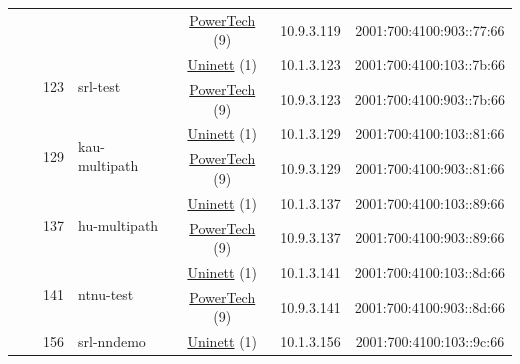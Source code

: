 \begin{small}
\begin{center}
\begin{longtable}{|c|c|c|c|c|c|c|c|}
  &  &  &  & \multicolumn{2}{|c|}{\tiny{\href{http://www.powertech.no}{PowerTech} (9)}} & \tiny{10.9.3.119} & \tiny{2001:700:4100:903::77:66} \\* \cline{3-3}\cline{4-4}\cline{5-5}\cline{6-6}\cline{7-7}\cline{8-8}
  &  & \multirow{2}{*}{\tiny{123}} & \multicolumn{1}{|l|}{\multirow{2}{*}{\tiny{srl-test}}} & \multicolumn{2}{|c|}{\tiny{\href{https://www.uninett.no}{Uninett} (1)}} & \tiny{10.1.3.123} & \tiny{2001:700:4100:103::7b:66} \\* \cline{5-5}\cline{6-6}\cline{7-7}\cline{8-8}
  &  &  &  & \multicolumn{2}{|c|}{\tiny{\href{http://www.powertech.no}{PowerTech} (9)}} & \tiny{10.9.3.123} & \tiny{2001:700:4100:903::7b:66} \\* \cline{3-3}\cline{4-4}\cline{5-5}\cline{6-6}\cline{7-7}\cline{8-8}
  &  & \multirow{2}{*}{\tiny{129}} & \multicolumn{1}{|l|}{\multirow{2}{*}{\tiny{kau-multipath}}} & \multicolumn{2}{|c|}{\tiny{\href{https://www.uninett.no}{Uninett} (1)}} & \tiny{10.1.3.129} & \tiny{2001:700:4100:103::81:66} \\* \cline{5-5}\cline{6-6}\cline{7-7}\cline{8-8}
  &  &  &  & \multicolumn{2}{|c|}{\tiny{\href{http://www.powertech.no}{PowerTech} (9)}} & \tiny{10.9.3.129} & \tiny{2001:700:4100:903::81:66} \\* \cline{3-3}\cline{4-4}\cline{5-5}\cline{6-6}\cline{7-7}\cline{8-8}
  &  & \multirow{2}{*}{\tiny{137}} & \multicolumn{1}{|l|}{\multirow{2}{*}{\tiny{hu-multipath}}} & \multicolumn{2}{|c|}{\tiny{\href{https://www.uninett.no}{Uninett} (1)}} & \tiny{10.1.3.137} & \tiny{2001:700:4100:103::89:66} \\* \cline{5-5}\cline{6-6}\cline{7-7}\cline{8-8}
  &  &  &  & \multicolumn{2}{|c|}{\tiny{\href{http://www.powertech.no}{PowerTech} (9)}} & \tiny{10.9.3.137} & \tiny{2001:700:4100:903::89:66} \\* \cline{3-3}\cline{4-4}\cline{5-5}\cline{6-6}\cline{7-7}\cline{8-8}
  &  & \multirow{2}{*}{\tiny{141}} & \multicolumn{1}{|l|}{\multirow{2}{*}{\tiny{ntnu-test}}} & \multicolumn{2}{|c|}{\tiny{\href{https://www.uninett.no}{Uninett} (1)}} & \tiny{10.1.3.141} & \tiny{2001:700:4100:103::8d:66} \\* \cline{5-5}\cline{6-6}\cline{7-7}\cline{8-8}
  &  &  &  & \multicolumn{2}{|c|}{\tiny{\href{http://www.powertech.no}{PowerTech} (9)}} & \tiny{10.9.3.141} & \tiny{2001:700:4100:903::8d:66} \\* \cline{3-3}\cline{4-4}\cline{5-5}\cline{6-6}\cline{7-7}\cline{8-8}
  &  & \multirow{2}{*}{\tiny{156}} & \multicolumn{1}{|l|}{\multirow{2}{*}{\tiny{srl-nndemo}}} & \multicolumn{2}{|c|}{\tiny{\href{https://www.uninett.no}{Uninett} (1)}} & \tiny{10.1.3.156} & \tiny{2001:700:4100:103::9c:66} \\* \cline{5-5}\cline{6-6}\cline{7-7}\cline{8-8}

\end{longtable}
\end{center}
\end{small}
